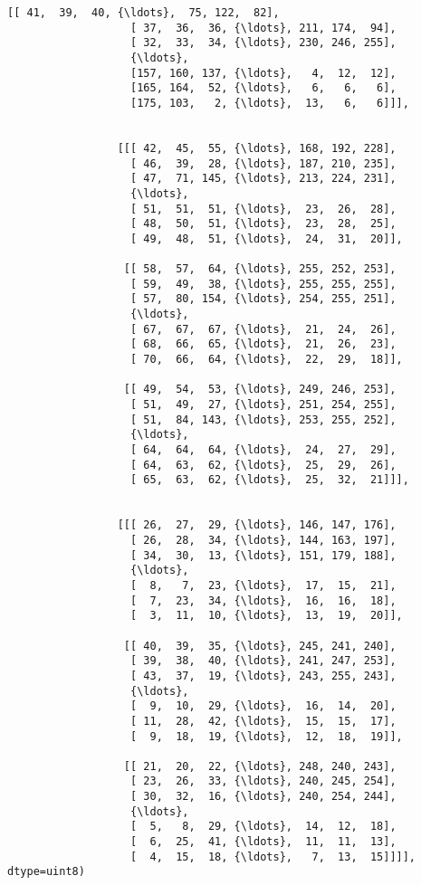 \documentclass[11pt]{article}
\begin{document}
\begin{Verbatim}[commandchars=\\\{\}]
                  [[ 41,  39,  40, {\ldots},  75, 122,  82],
                   [ 37,  36,  36, {\ldots}, 211, 174,  94],
                   [ 32,  33,  34, {\ldots}, 230, 246, 255],
                   {\ldots}, 
                   [157, 160, 137, {\ldots},   4,  12,  12],
                   [165, 164,  52, {\ldots},   6,   6,   6],
                   [175, 103,   2, {\ldots},  13,   6,   6]]],
          
          
                 [[[ 42,  45,  55, {\ldots}, 168, 192, 228],
                   [ 46,  39,  28, {\ldots}, 187, 210, 235],
                   [ 47,  71, 145, {\ldots}, 213, 224, 231],
                   {\ldots}, 
                   [ 51,  51,  51, {\ldots},  23,  26,  28],
                   [ 48,  50,  51, {\ldots},  23,  28,  25],
                   [ 49,  48,  51, {\ldots},  24,  31,  20]],
          
                  [[ 58,  57,  64, {\ldots}, 255, 252, 253],
                   [ 59,  49,  38, {\ldots}, 255, 255, 255],
                   [ 57,  80, 154, {\ldots}, 254, 255, 251],
                   {\ldots}, 
                   [ 67,  67,  67, {\ldots},  21,  24,  26],
                   [ 68,  66,  65, {\ldots},  21,  26,  23],
                   [ 70,  66,  64, {\ldots},  22,  29,  18]],
          
                  [[ 49,  54,  53, {\ldots}, 249, 246, 253],
                   [ 51,  49,  27, {\ldots}, 251, 254, 255],
                   [ 51,  84, 143, {\ldots}, 253, 255, 252],
                   {\ldots}, 
                   [ 64,  64,  64, {\ldots},  24,  27,  29],
                   [ 64,  63,  62, {\ldots},  25,  29,  26],
                   [ 65,  63,  62, {\ldots},  25,  32,  21]]],
          
          
                 [[[ 26,  27,  29, {\ldots}, 146, 147, 176],
                   [ 26,  28,  34, {\ldots}, 144, 163, 197],
                   [ 34,  30,  13, {\ldots}, 151, 179, 188],
                   {\ldots}, 
                   [  8,   7,  23, {\ldots},  17,  15,  21],
                   [  7,  23,  34, {\ldots},  16,  16,  18],
                   [  3,  11,  10, {\ldots},  13,  19,  20]],
          
                  [[ 40,  39,  35, {\ldots}, 245, 241, 240],
                   [ 39,  38,  40, {\ldots}, 241, 247, 253],
                   [ 43,  37,  19, {\ldots}, 243, 255, 243],
                   {\ldots}, 
                   [  9,  10,  29, {\ldots},  16,  14,  20],
                   [ 11,  28,  42, {\ldots},  15,  15,  17],
                   [  9,  18,  19, {\ldots},  12,  18,  19]],
          
                  [[ 21,  20,  22, {\ldots}, 248, 240, 243],
                   [ 23,  26,  33, {\ldots}, 240, 245, 254],
                   [ 30,  32,  16, {\ldots}, 240, 254, 244],
                   {\ldots}, 
                   [  5,   8,  29, {\ldots},  14,  12,  18],
                   [  6,  25,  41, {\ldots},  11,  11,  13],
                   [  4,  15,  18, {\ldots},   7,  13,  15]]]], dtype=uint8)
\end{Verbatim}
            
\end{document}
